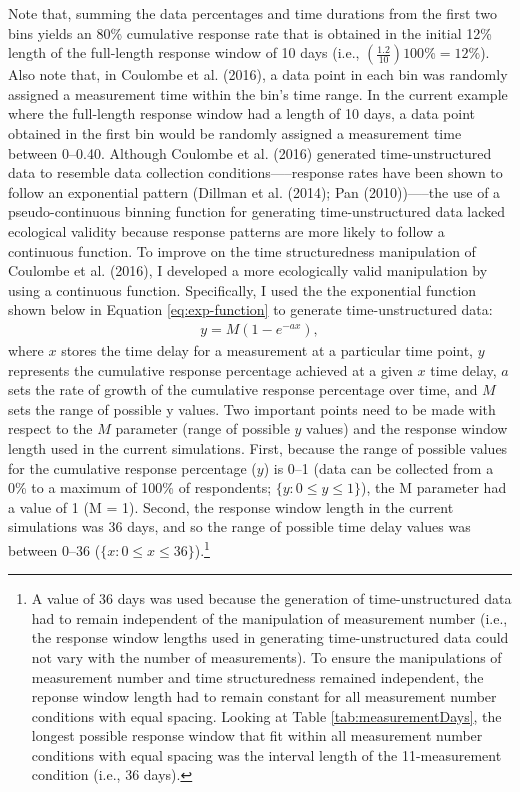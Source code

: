 \documentclass[
12pt, %
twoside,
english]{guelphthesis}
\begin{document}
\noindent Note that, summing the data percentages and time durations from the first two bins yields an 80\% cumulative response rate that is obtained in the initial 12\% length of the full-length response window of 10 days (i.e., \((\frac{1.2}{10})100\% = 12\%\)). Also note that, in Coulombe et al. (2016), a data point in each bin was randomly assigned a measurement time within the bin's time range. In the current example where the full-length response window had a length of 10 days, a data point obtained in the first bin would be randomly assigned a measurement time between 0--0.40. Although Coulombe et al. (2016) generated time-unstructured data to resemble data collection conditions-----response rates have been shown to follow an exponential pattern (Dillman et al. (2014); Pan (2010))-----the use of a pseudo-continuous binning function for generating time-unstructured data lacked ecological validity because response patterns are more likely to follow a continuous function.
To improve on the time structuredness manipulation of Coulombe et al. (2016), I developed a more ecologically valid manipulation by using a continuous function. Specifically, I used the the exponential function shown below in Equation \ref{eq:exp-function} to generate time-unstructured data:
\begin{align}
y = M(1 - e^{-ax}),
\label{eq:exp-function} 
\end{align}
\noindent where \(x\) stores the time delay for a measurement at a particular time point, \(y\) represents the cumulative response percentage achieved at a given \(x\) time delay, \(a\) sets the rate of growth of the cumulative response percentage over time, and \(M\) sets the range of possible y values. Two important points need to be made with respect to the \(M\) parameter (range of possible \(y\) values) and the response window length used in the current simulations. First, because the range of possible values for the cumulative response percentage (\(y\)) is 0--1 (data can be collected from a 0\% to a maximum of 100\% of respondents; \(\{y : 0 \le y \le 1\}\)), the M parameter had a value of 1 (M = 1). Second, the response window length in the current simulations was 36 days, and so the range of possible time delay values was between 0--36 (\(\{x:0\le x \le36\}\)).\footnote{A value of 36 days was used because the generation of time-unstructured data had to remain independent of the manipulation of measurement number (i.e., the response window lengths used in generating time-unstructured data could not vary with the number of measurements). To ensure the manipulations of measurement number and time structuredness remained independent, the reponse window length had to remain constant for all measurement number conditions with equal spacing. Looking at Table \ref{tab:measurementDays}, the longest possible response window that fit within all measurement number conditions with equal spacing was the interval length of the 11-measurement condition (i.e., 36 days).}
\end{document}
